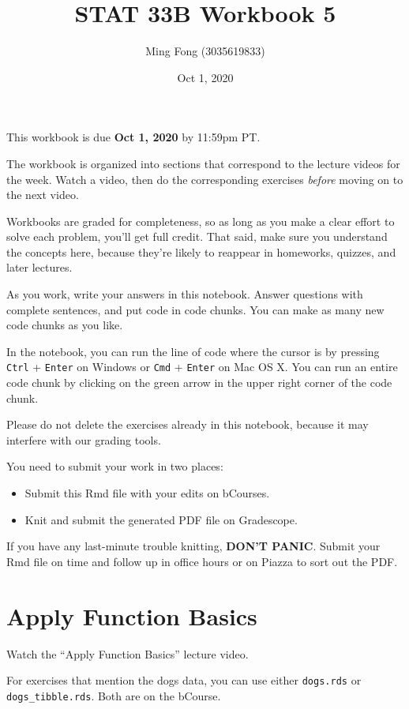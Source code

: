 \documentclass[
]{article}
\title{STAT 33B Workbook 5}
\author{Ming Fong (3035619833)}
\date{Oct 1, 2020}
\providecommand{\tightlist}{%
  \setlength{\itemsep}{0pt}\setlength{\parskip}{0pt}}
\begin{document}
\maketitle

This workbook is due \textbf{Oct 1, 2020} by 11:59pm PT.

The workbook is organized into sections that correspond to the lecture
videos for the week. Watch a video, then do the corresponding exercises
\emph{before} moving on to the next video.

Workbooks are graded for completeness, so as long as you make a clear
effort to solve each problem, you'll get full credit. That said, make
sure you understand the concepts here, because they're likely to
reappear in homeworks, quizzes, and later lectures.

As you work, write your answers in this notebook. Answer questions with
complete sentences, and put code in code chunks. You can make as many
new code chunks as you like.

In the notebook, you can run the line of code where the cursor is by
pressing \texttt{Ctrl} + \texttt{Enter} on Windows or \texttt{Cmd} +
\texttt{Enter} on Mac OS X. You can run an entire code chunk by clicking
on the green arrow in the upper right corner of the code chunk.

Please do not delete the exercises already in this notebook, because it
may interfere with our grading tools.

You need to submit your work in two places:

\begin{itemize}
\tightlist
\item
  Submit this Rmd file with your edits on bCourses.
\item
  Knit and submit the generated PDF file on Gradescope.
\end{itemize}

If you have any last-minute trouble knitting, \textbf{DON'T PANIC}.
Submit your Rmd file on time and follow up in office hours or on Piazza
to sort out the PDF.

\hypertarget{apply-function-basics}{%
\section{Apply Function Basics}\label{apply-function-basics}}

Watch the ``Apply Function Basics'' lecture video.

For exercises that mention the dogs data, you can use either
\texttt{dogs.rds} or \texttt{dogs\_tibble.rds}. Both are on the bCourse.
\end{document}
